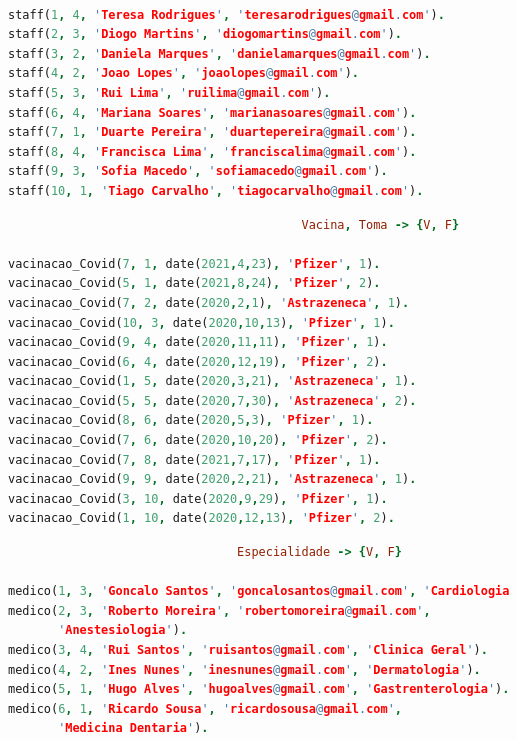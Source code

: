 \documentclass[a4paper, 11pt]{article}
\begin{document}
\pagebreak

\begin{lstlisting}[language=Prolog, caption={Base de conhecimento de \texttt{staff}}]
% Extensao do predicado staff: #Idstaff, #Idcentro, Nome, email -> {V, F}

staff(1, 4, 'Teresa Rodrigues', 'teresarodrigues@gmail.com').
staff(2, 3, 'Diogo Martins', 'diogomartins@gmail.com').
staff(3, 2, 'Daniela Marques', 'danielamarques@gmail.com').
staff(4, 2, 'Joao Lopes', 'joaolopes@gmail.com').
staff(5, 3, 'Rui Lima', 'ruilima@gmail.com').
staff(6, 4, 'Mariana Soares', 'marianasoares@gmail.com').
staff(7, 1, 'Duarte Pereira', 'duartepereira@gmail.com').
staff(8, 4, 'Francisca Lima', 'franciscalima@gmail.com').
staff(9, 3, 'Sofia Macedo', 'sofiamacedo@gmail.com').
staff(10, 1, 'Tiago Carvalho', 'tiagocarvalho@gmail.com').
\end{lstlisting}

\vspace{3.5cm}

\begin{lstlisting}[language=Prolog, caption={Base de conhecimento de \texttt{vacinacao\_Covid}}]
% Extensao do predicado vacinacao_Covid: #Idstaff, #Idutente, Data,
                                         Vacina, Toma -> {V, F}
                                         
vacinacao_Covid(7, 1, date(2021,4,23), 'Pfizer', 1).
vacinacao_Covid(5, 1, date(2021,8,24), 'Pfizer', 2).
vacinacao_Covid(7, 2, date(2020,2,1), 'Astrazeneca', 1).
vacinacao_Covid(10, 3, date(2020,10,13), 'Pfizer', 1).
vacinacao_Covid(9, 4, date(2020,11,11), 'Pfizer', 1).
vacinacao_Covid(6, 4, date(2020,12,19), 'Pfizer', 2).
vacinacao_Covid(1, 5, date(2020,3,21), 'Astrazeneca', 1).
vacinacao_Covid(5, 5, date(2020,7,30), 'Astrazeneca', 2).
vacinacao_Covid(8, 6, date(2020,5,3), 'Pfizer', 1).
vacinacao_Covid(7, 6, date(2020,10,20), 'Pfizer', 2).
vacinacao_Covid(7, 8, date(2021,7,17), 'Pfizer', 1).
vacinacao_Covid(9, 9, date(2020,2,21), 'Astrazeneca', 1).
vacinacao_Covid(3, 10, date(2020,9,29), 'Pfizer', 1).
vacinacao_Covid(1, 10, date(2020,12,13), 'Pfizer', 2).
\end{lstlisting}

\pagebreak

\begin{lstlisting}[language=Prolog, caption={Base de conhecimento de \texttt{medico}}]
% Extensao do predicado medico: #Idmedico, #Idcentro, Nome, Email,
                                Especialidade -> {V, F}

medico(1, 3, 'Goncalo Santos', 'goncalosantos@gmail.com', 'Cardiologia').
medico(2, 3, 'Roberto Moreira', 'robertomoreira@gmail.com',
       'Anestesiologia').
medico(3, 4, 'Rui Santos', 'ruisantos@gmail.com', 'Clinica Geral').
medico(4, 2, 'Ines Nunes', 'inesnunes@gmail.com', 'Dermatologia').
medico(5, 1, 'Hugo Alves', 'hugoalves@gmail.com', 'Gastrenterologia').
medico(6, 1, 'Ricardo Sousa', 'ricardosousa@gmail.com',
       'Medicina Dentaria').
\end{lstlisting}
\end{document}
